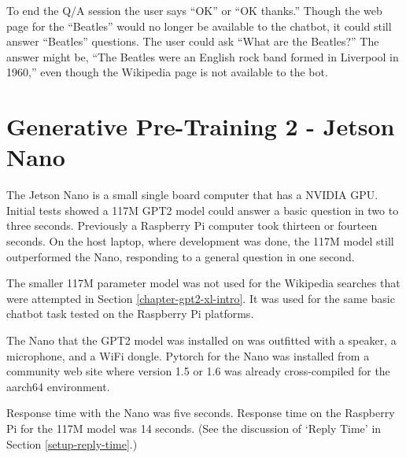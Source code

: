 To end the Q/A session the user says ``OK'' or ``OK thanks.'' Though the web page for the ``Beatles'' would no longer be available to the chatbot, it could still answer ``Beatles''  questions. The user could ask ``What are the Beatles?'' The answer might be, ``The Beatles were an English rock band formed in Liverpool in 1960,'' even though the Wikipedia page is not available to the bot.

\label{chapter-xlarge}

\section{Generative Pre-Training 2 - Jetson Nano}

\label{chapter-nano}
The Jetson Nano is a small single board computer that has a NVIDIA GPU. Initial tests showed a 117M GPT2 model could answer a basic question in two to three seconds. Previously a Raspberry Pi computer took thirteen or fourteen seconds. On the host laptop, where development was done, the 117M model still outperformed the Nano, responding to a general question in one second.

The smaller 117M parameter model was not used for the Wikipedia searches that were attempted in Section \ref{chapter-gpt2-xl-intro}. It was used for the same basic chatbot task tested on the Raspberry Pi platforms.


The Nano that the GPT2 model was installed on was outfitted with a speaker, a microphone, and a WiFi dongle. Pytorch for the Nano was installed from a community web site where version 1.5 or 1.6 was already cross-compiled for the aarch64 environment. 

Response time with the Nano was five seconds. Response time on the Raspberry Pi for the 117M model was 14 seconds. (See the discussion of `Reply Time' in Section \ref{setup-reply-time}.)
